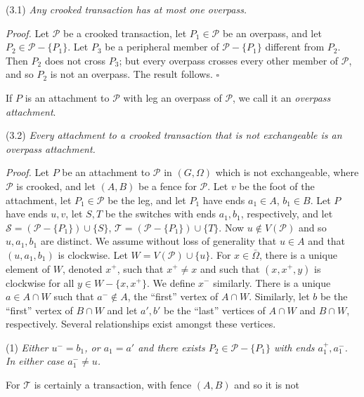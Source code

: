 
\stmt
(3.1) \textit{Any crooked transaction has at most one overpass.}

\textit{Proof.} Let $\mathscr{P}$ be a crooked transaction, let $P_1 \in \mathscr{P}$ be an overpass, and let $P_2 \in \mathscr{P} - \{P_1\}$. Let $P_3$ be a peripheral member of $\mathscr{P} - \{P_1\}$ different from $P_2$. Then $P_2$ does not cross $P_3$; but every overpass crosses every other member of $\mathscr{P}$, and so $P_2$ is not an overpass. The result follows. $\square$

If $P$ is an attachment to $\mathscr{P}$ with leg an overpass of $\mathscr{P}$, we call it an \textit{overpass attachment}.

\stmt
(3.2) \textit{Every attachment to a crooked transaction that is not exchangeable is an overpass attachment.}

\textit{Proof.} Let $P$ be an attachment to $\mathscr{P}$ in $(G, \Omega)$ which is not exchangeable, where $\mathscr{P}$ is crooked, and let $(A, B)$ be a fence for $\mathscr{P}$. Let $v$ be the foot of the attachment, let $P_1 \in \mathscr{P}$ be the leg, and let $P_1$ have ends $a_1 \in A$, $b_1 \in B$. Let $P$ have ends $u, v$, let $S, T$ be the switches with ends $a_1, b_1$, respectively, and let $\mathscr{S} = (\mathscr{P} - \{P_1\}) \cup \{S\}$, $\mathscr{T} = (\mathscr{P} - \{P_1\}) \cup \{T\}$. Now $u \notin V(\mathscr{P})$ and so $u, a_1, b_1$ are distinct. We assume without loss of generality that $u \in A$ and that $(u, a_1, b_1)$ is clockwise. Let $W = V(\mathscr{P}) \cup \{u\}$. For $x \in \bar{\Omega}$, there is a unique element of $W$, denoted $x^+$, such that $x^+ \ne x$ and such that $(x, x^+, y)$ is clockwise for all $y \in W - \{x, x^+\}$. We define $x^-$ similarly. There is a unique $a \in A \cap W$ such that $a^- \notin A$, the ``first'' vertex of $A \cap W$. Similarly, let $b$ be the ``first'' vertex of $B \cap W$ and let $a', b'$ be the ``last'' vertices of $A \cap W$ and $B \cap W$, respectively. Several relationships exist amongst these vertices.

\hspace*{12pt}(1) \textit{Either $u^- = b_1$, or $a_1 = a'$ and there exists $P_2 \in \mathscr{P} - \{P_1\}$ with ends $a_1^+, a_1^-$. In either case $a_1^- \ne u$.}

For $\mathscr{T}$ is certainly a transaction, with fence $(A, B)$ and so it is not
